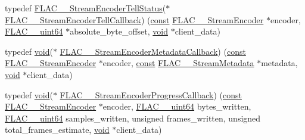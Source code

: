 \begin{DoxyCompactItemize}
\item 
typedef \hyperlink{group__flac__stream__encoder_gab628f63181250eb977a28bf12b7dd9ff}{F\+L\+A\+C\+\_\+\+\_\+\+Stream\+Encoder\+Tell\+Status}($\ast$ \hyperlink{group__flac__stream__encoder_gabefdf2279e1d0347d9f98f46da4e415b}{F\+L\+A\+C\+\_\+\+\_\+\+Stream\+Encoder\+Tell\+Callback}) (\hyperlink{getopt1_8c_a2c212835823e3c54a8ab6d95c652660e}{const} \hyperlink{struct_f_l_a_c_____stream_encoder}{F\+L\+A\+C\+\_\+\+\_\+\+Stream\+Encoder} $\ast$encoder, \hyperlink{ordinals_8h_aa78c8c70a3eb8a58af7436f278acde8e}{F\+L\+A\+C\+\_\+\+\_\+uint64} $\ast$absolute\+\_\+byte\+\_\+offset, \hyperlink{sound_8c_ae35f5844602719cf66324f4de2a658b3}{void} $\ast$client\+\_\+data)
\item 
typedef \hyperlink{sound_8c_ae35f5844602719cf66324f4de2a658b3}{void}($\ast$ \hyperlink{group__flac__stream__encoder_ga091fbf3340d85bcbda1090c31bc320cf}{F\+L\+A\+C\+\_\+\+\_\+\+Stream\+Encoder\+Metadata\+Callback}) (\hyperlink{getopt1_8c_a2c212835823e3c54a8ab6d95c652660e}{const} \hyperlink{struct_f_l_a_c_____stream_encoder}{F\+L\+A\+C\+\_\+\+\_\+\+Stream\+Encoder} $\ast$encoder, \hyperlink{getopt1_8c_a2c212835823e3c54a8ab6d95c652660e}{const} \hyperlink{struct_f_l_a_c_____stream_metadata}{F\+L\+A\+C\+\_\+\+\_\+\+Stream\+Metadata} $\ast$metadata, \hyperlink{sound_8c_ae35f5844602719cf66324f4de2a658b3}{void} $\ast$client\+\_\+data)
\item 
typedef \hyperlink{sound_8c_ae35f5844602719cf66324f4de2a658b3}{void}($\ast$ \hyperlink{group__flac__stream__encoder_ga6e051c0e5837433f9e7cd56cd42ca6ba}{F\+L\+A\+C\+\_\+\+\_\+\+Stream\+Encoder\+Progress\+Callback}) (\hyperlink{getopt1_8c_a2c212835823e3c54a8ab6d95c652660e}{const} \hyperlink{struct_f_l_a_c_____stream_encoder}{F\+L\+A\+C\+\_\+\+\_\+\+Stream\+Encoder} $\ast$encoder, \hyperlink{ordinals_8h_aa78c8c70a3eb8a58af7436f278acde8e}{F\+L\+A\+C\+\_\+\+\_\+uint64} bytes\+\_\+written, \hyperlink{ordinals_8h_aa78c8c70a3eb8a58af7436f278acde8e}{F\+L\+A\+C\+\_\+\+\_\+uint64} samples\+\_\+written, unsigned frames\+\_\+written, unsigned total\+\_\+frames\+\_\+estimate, \hyperlink{sound_8c_ae35f5844602719cf66324f4de2a658b3}{void} $\ast$client\+\_\+data)
\end{DoxyCompactItemize}
